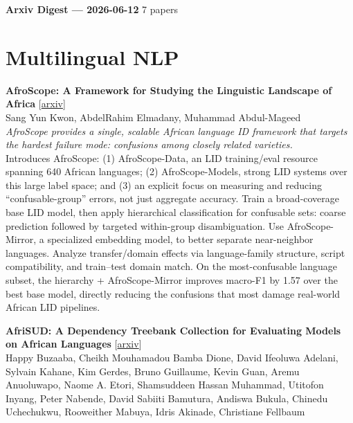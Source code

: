 \documentclass[12pt,letterpaper]{article}
\begin{document}
{\footnotesize\textbf{Arxiv Digest --- 2026-06-12} \hfill 7 papers}

\smallskip

\section*{Multilingual NLP}

{\small\textbf{AfroScope: A Framework for Studying the Linguistic Landscape of Africa}} {\scriptsize[\href{https://arxiv.org/abs/2601.13346}{arxiv}]}\\
{\scriptsize Sang Yun Kwon, AbdelRahim Elmadany, Muhammad Abdul-Mageed}\\

{\small\textit{AfroScope provides a single, scalable African language ID framework that targets the hardest failure mode: confusions among closely related varieties.}}\\[1pt]
{\footnotesize Introduces AfroScope: (1) AfroScope-Data, an LID training/eval resource spanning 640 African languages; (2) AfroScope-Models, strong LID systems over this large label space; and (3) an explicit focus on measuring and reducing ``confusable-group'' errors, not just aggregate accuracy. Train a broad-coverage base LID model, then apply hierarchical classification for confusable sets: coarse prediction followed by targeted within-group disambiguation. Use AfroScope-Mirror, a specialized embedding model, to better separate near-neighbor languages. Analyze transfer/domain effects via language-family structure, script compatibility, and train--test domain match. On the most-confusable language subset, the hierarchy + AfroScope-Mirror improves macro-F1 by 1.57 over the best base model, directly reducing the confusions that most damage real-world African LID pipelines.}

\medskip

{\small\textbf{AfriSUD: A Dependency Treebank Collection for Evaluating Models on African Languages}} {\scriptsize[\href{https://arxiv.org/abs/2606.12708}{arxiv}]}\\
{\scriptsize Happy Buzaaba, Cheikh Mouhamadou Bamba Dione, David Ifeoluwa Adelani, Sylvain Kahane, Kim Gerdes, Bruno Guillaume, Kevin Guan, Aremu Anuoluwapo, Naome A. Etori, Shamsuddeen Hassan Muhammad, Utitofon Inyang, Peter Nabende, David Sabiiti Bamutura, Andiswa Bukula, Chinedu Uchechukwu, Rooweither Mabuya, Idris Akinade, Christiane Fellbaum}\\
\end{document}
